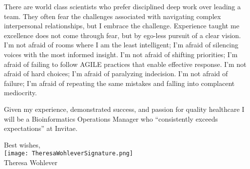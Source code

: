 \documentclass[10pt,letterpaper]{article}
\begin{document}
There are world class scientists who prefer disciplined deep work over leading a team. They often fear the challenges associated with navigating complex interpersonal relationships, but I embrace the challenge. Experience taught me excellence does not come through fear, but by ego-less pursuit of a clear vision. I’m not afraid of rooms where I am the least intelligent; I’m afraid of silencing voices with the most informed insight. I’m not afraid of shifting priorities; I’m afraid of failing to follow AGILE practices that enable effective response. I’m not afraid of hard choices; I’m afraid of paralyzing indecision. I’m not afraid of failure; I’m afraid of repeating the same mistakes and falling into complacent mediocrity.

Given my experience, demonstrated success, and passion for quality healthcare I will be a Bioinformatics Operations Manager who “consistently exceeds expectations” at Invitae.




\hspace*{.6\linewidth} Best wishes, \\
\hspace*{.57\linewidth} \texttt{[image: TheresaWohleverSignature.png]}  {\vspace{-9pt}} \\
\hspace*{.6\linewidth}  Theresa Wohlever
\end{document}
